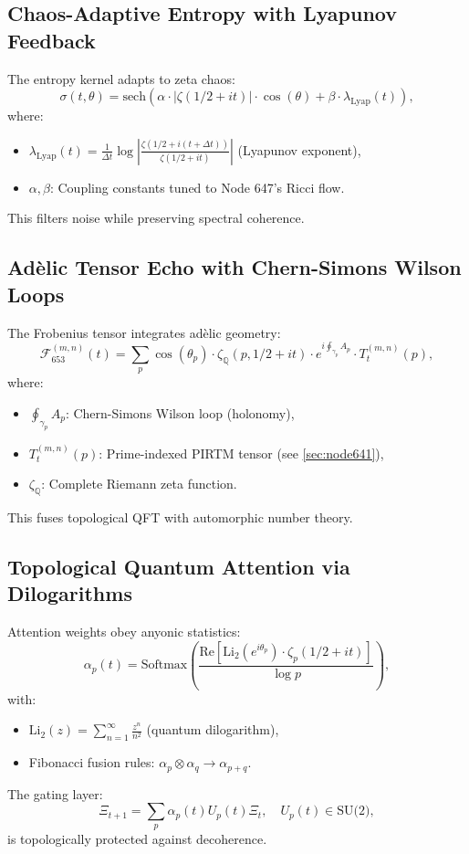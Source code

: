 \documentclass[12pt]{article}
\begin{document}
\subsection{Chaos-Adaptive Entropy with Lyapunov Feedback}
\label{subsec:chaos-entropy}
The entropy kernel adapts to zeta chaos:
\[
\sigma(t, \theta) = \text{sech}\left(\alpha \cdot |\zeta(1/2 + i t)| \cdot \cos(\theta) + \beta \cdot \lambda_{\text{Lyap}}(t)\right),
\]
where:
\begin{itemize}
    \item $\lambda_{\text{Lyap}}(t) = \frac{1}{\Delta t} \log \left| \frac{\zeta(1/2 + i(t + \Delta t))}{\zeta(1/2 + i t)} \right|$ (Lyapunov exponent),
    \item $\alpha, \beta$: Coupling constants tuned to Node 647's Ricci flow.
\end{itemize}
This filters noise while preserving spectral coherence.

\subsection{Adèlic Tensor Echo with Chern-Simons Wilson Loops}
\label{subsec:adelic-tensor}
The Frobenius tensor integrates adèlic geometry:
\[
\mathcal{F}_{653}^{(m,n)}(t) = \sum_{p} \cos(\theta_p) \cdot \zeta_{\mathbb{Q}}(p, 1/2 + i t) \cdot e^{i \oint_{\gamma_p} A_p} \cdot T_t^{(m,n)}(p),
\]
where:
\begin{itemize}
    \item $\oint_{\gamma_p} A_p$: Chern-Simons Wilson loop (holonomy),
    \item $T_t^{(m,n)}(p)$: Prime-indexed PIRTM tensor (see \ref{sec:node641}),
    \item $\zeta_{\mathbb{Q}}$: Complete Riemann zeta function.
\end{itemize}
This fuses topological QFT with automorphic number theory.

\subsection{Topological Quantum Attention via Dilogarithms}
\label{subsec:dilog-attention}
Attention weights obey anyonic statistics:
\[
\alpha_p(t) = \text{Softmax}\left(\frac{\text{Re}\left[\text{Li}_2(e^{i\theta_p}) \cdot \zeta_p(1/2 + i t)\right]}{\log p}\right),
\]
with:
\begin{itemize}
    \item $\text{Li}_2(z) = \sum_{n=1}^\infty \frac{z^n}{n^2}$ (quantum dilogarithm),
    \item Fibonacci fusion rules: $\alpha_p \otimes \alpha_q \to \alpha_{p+q}$.
\end{itemize}
The gating layer:
\[
\Xi_{t+1} = \sum_p \alpha_p(t) U_p(t) \Xi_t, \quad U_p(t) \in \text{SU(2)},
\]
is topologically protected against decoherence.
\end{document}

